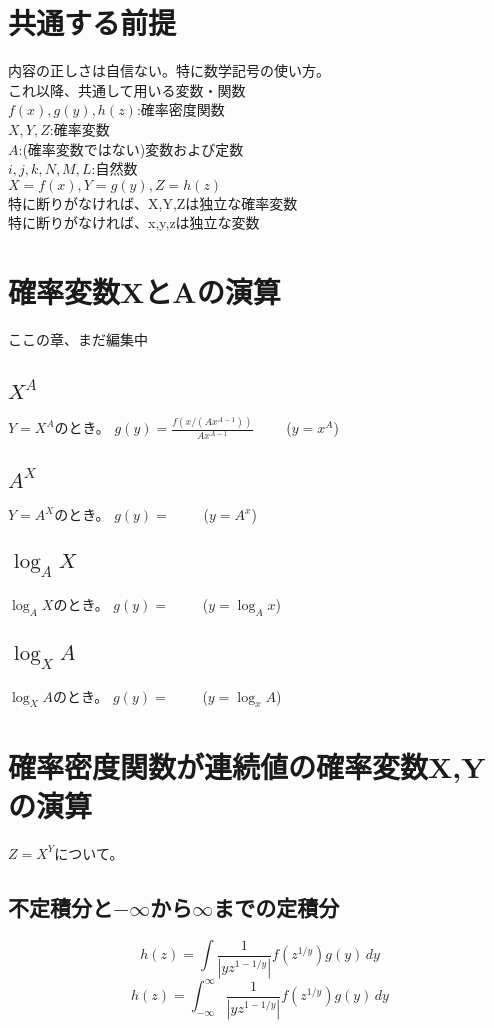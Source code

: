 \documentclass[a4paper,11pt]{ltjsarticle}
\begin{document}
\tableofcontents
\newpage



\section{共通する前提}
内容の正しさは自信ない。特に数学記号の使い方。\\

これ以降、共通して用いる変数・関数\\
$f(x), g(y), h(z)$:確率密度関数\\
$X, Y, Z$:確率変数\\
$A$:(確率変数ではない)変数および定数\\
$i,j,k,N,M,L$:自然数\\
$X=f(x), Y=g(y), Z=h(z)$\\
特に断りがなければ、X,Y,Zは独立な確率変数\\
特に断りがなければ、x,y,zは独立な変数
\newpage


\section{確率変数XとAの演算}
ここの章、まだ編集中
\subsection{$X^A$}
$Y=X^A$のとき。%
$g(y) = \frac{f(x/(Ax^{A-1}))}{Ax^{A-1}}$
\ \ \ \ ($y=x^A$)
\subsection{$A^X$}
$Y=A^X$のとき。
$g(y) = $
\ \ \ \ ($y=A^x$)
\subsection{$\log_AX$}
$\log_AX$のとき。
$g(y) = $
\ \ \ \ ($y=\log_Ax$)
\subsection{$\log_XA$}
$\log_XA$のとき。
$g(y) = $
\ \ \ \ ($y=\log_xA$)
\newpage


\section{確率密度関数が連続値の確率変数X,Yの演算}
$Z=X^Y$について。
\subsection{不定積分と$-\infty$から$\infty$までの定積分}
$$
    h(z) = \int \frac{1}{|yz^{1-1/y}|} f(z^{1/y}) g(y) \, dy
$$
$$
    h(z) = \int_{-\infty}^{\infty} \frac{1}{|yz^{1-1/y}|} f(z^{1/y}) g(y) \, dy
$$
\end{document}
